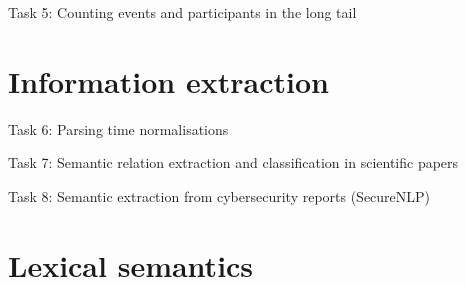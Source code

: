 \documentclass[10pt, compress]{beamer}
\begin{document}



\begin{frame}{Task 5: Counting events and participants in the long tail}


\end{frame}





\section{Information extraction}

\begin{frame}{Task 6: Parsing time normalisations}


\end{frame}




\begin{frame}{Task 7: Semantic relation extraction and classification in scientific papers}


\end{frame}




\begin{frame}{Task 8: Semantic extraction from cybersecurity reports (SecureNLP)}


\end{frame}




\section{Lexical semantics}
\end{document}
